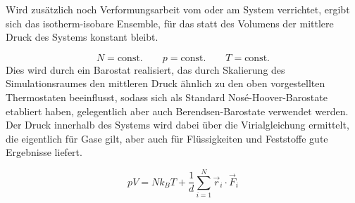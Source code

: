 Wird zusätzlich noch Verformungsarbeit vom oder am System verrichtet, ergibt sich das isotherm-isobare Ensemble, für das statt des Volumens der mittlere Druck des Systems konstant bleibt.

\begin{equation}
  N = \text{const.}
  \qquad
  p = \text{const.}
  \qquad
  T = \text{const.}
\end{equation}
Dies wird durch ein Barostat realisiert, das durch Skalierung des Simulationsraumes den mittleren Druck ähnlich zu den oben vorgestellten Thermostaten beeinflusst, sodass sich als Standard Nosé-Hoover-Barostate\cite{nose_unified_1984} etabliert haben, gelegentlich aber auch Berendsen-Barostate verwendet werden.
Der Druck innerhalb des Systems wird dabei über die Virialgleichung ermittelt, die eigentlich für Gase gilt, aber auch für Flüssigkeiten und Feststoffe gute Ergebnisse liefert.

\begin{equation}
  p V = N k_B T + \frac{1}{d} \sum_{i=1}^N{\vec{r}_i \cdot \vec{F}_i}
\end{equation}




